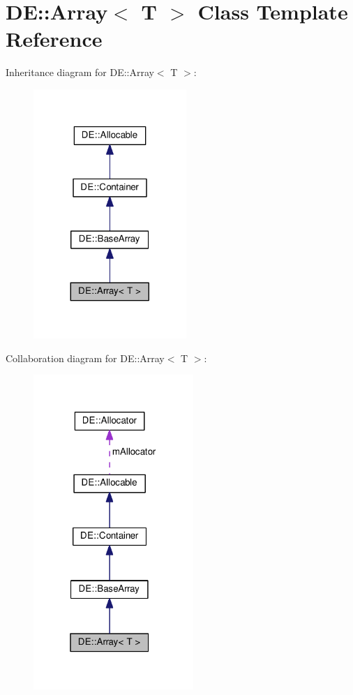 \hypertarget{classDE_1_1Array}{}\section{DE\+:\+:Array$<$ T $>$ Class Template Reference}
\label{classDE_1_1Array}


Inheritance diagram for DE\+:\+:Array$<$ T $>$\+:\nopagebreak
\begin{figure}[H]
\begin{center}
\leavevmode
\includegraphics[width=164pt]{classDE_1_1Array__inherit__graph}
\end{center}
\end{figure}


Collaboration diagram for DE\+:\+:Array$<$ T $>$\+:\nopagebreak
\begin{figure}[H]
\begin{center}
\leavevmode
\includegraphics[width=172pt]{classDE_1_1Array__coll__graph}
\end{center}
\end{figure}
